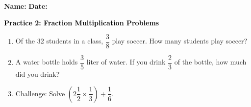 \documentclass[12pt, letterpaper, fleqn]{article}
\begin{document}
\textbf{Name:} \underline{\hspace{5cm}}
\hfill
\textbf{Date:} \underline{\hspace{3cm}}\\

\begin{tcolorbox}[colback=customteal!20]
    \large\textcolor{black}{\textbf{Practice 2: Fraction Multiplication Problems}}
\end{tcolorbox}
\begin{enumerate}[itemsep=3.5cm, leftmargin=0.6cm]
\item Of the 32 students in a class, $\dfrac{3}{8}$ play soccer. How many students play soccer?
\vspace{3.5cm}
\item A water bottle holds $\dfrac{3}{5}$ liter of water. If you drink $\dfrac{2}{3}$ of the bottle, how much did you drink?
\vspace{3.5cm}
\item Challenge: Solve $\left(2\dfrac{1}{2} \times \dfrac{1}{3}\right) + \dfrac{1}{6}$.
\end{enumerate}
\end{document}
